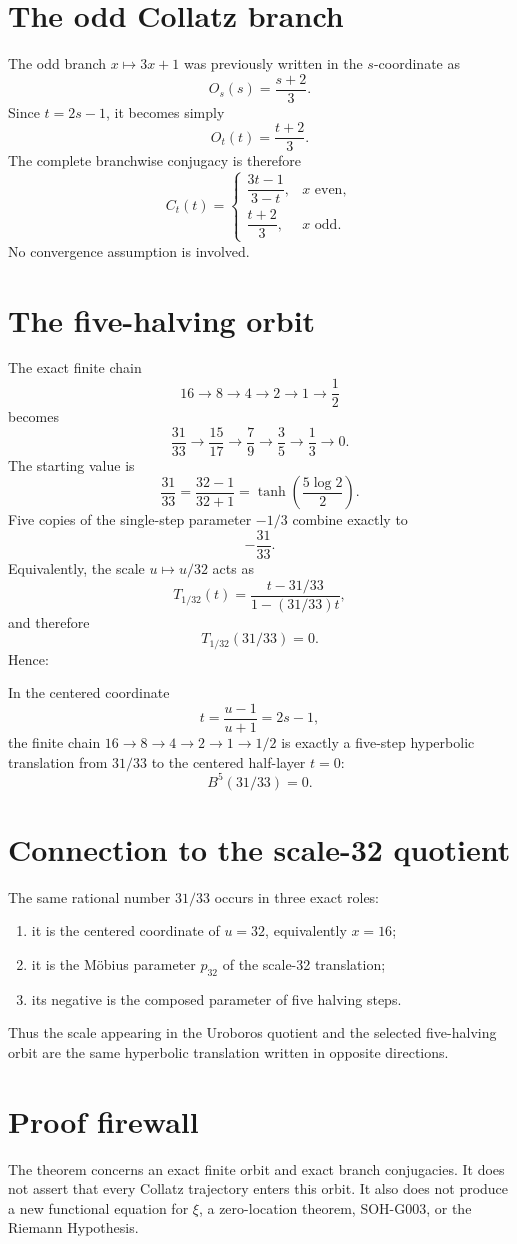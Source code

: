 \section{The odd Collatz branch}

The odd branch \(x\mapsto3x+1\) was previously written in the \(s\)-coordinate as
\[
O_s(s)=\frac{s+2}{3}.
\]
Since \(t=2s-1\), it becomes simply
\[
\boxed{O_t(t)=\frac{t+2}{3}.}
\]
The complete branchwise conjugacy is therefore
\[
\boxed{
C_t(t)=
\begin{cases}
\dfrac{3t-1}{3-t}, & x\text{ even},\\[0.75em]
\dfrac{t+2}{3}, & x\text{ odd}.
\end{cases}}
\]
No convergence assumption is involved.

\section{The five-halving orbit}

The exact finite chain
\[
16\to8\to4\to2\to1\to\frac12
\]
becomes
\[
\boxed{
\frac{31}{33}
\to\frac{15}{17}
\to\frac79
\to\frac35
\to\frac13
\to0.
}
\]
The starting value is
\[
\frac{31}{33}
=\frac{32-1}{32+1}
=\tanh\!\left(\frac{5\log2}{2}\right).
\]
Five copies of the single-step parameter \(-1/3\) combine exactly to
\[
\boxed{-\frac{31}{33}}.
\]
Equivalently, the scale \(u\mapsto u/32\) acts as
\[
T_{1/32}(t)
=\frac{t-31/33}{1-(31/33)t},
\]
and therefore
\[
\boxed{T_{1/32}(31/33)=0.}
\]
Hence:

\begin{theorem}[SOH-G009]
In the centered coordinate
\[
t=\frac{u-1}{u+1}=2s-1,
\]
the finite chain \(16\to8\to4\to2\to1\to1/2\) is exactly a five-step hyperbolic translation from \(31/33\) to the centered half-layer \(t=0\):
\[
\boxed{B^5(31/33)=0.}
\]
\end{theorem}

\section{Connection to the scale-32 quotient}

The same rational number \(31/33\) occurs in three exact roles:
\begin{enumerate}
\item it is the centered coordinate of \(u=32\), equivalently \(x=16\);
\item it is the M\"obius parameter \(p_{32}\) of the scale-32 translation;
\item its negative is the composed parameter of five halving steps.
\end{enumerate}
Thus the scale appearing in the Uroboros quotient and the selected five-halving orbit are the same hyperbolic translation written in opposite directions.

\section{Proof firewall}

The theorem concerns an exact finite orbit and exact branch conjugacies.  It does not assert that every Collatz trajectory enters this orbit.  It also does not produce a new functional equation for \(\xi\), a zero-location theorem, SOH-G003, or the Riemann Hypothesis.

